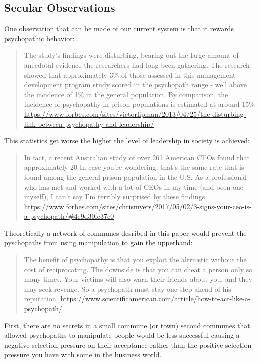 \documentclass[11pt]{article}
\begin{document}
\subsection{Secular Observations}

One observation that can be made of our current system is that it rewards psychopathic behavior:
\begin{quote}
   The study's findings were disturbing, bearing out the large amount of anecdotal evidence the researchers had long been gathering. The research showed that approximately 3\% of those assessed in this management development program study scored in the
   psychopath range - well above the incidence of 1\% in the general population. By comparison, the incidence of psychopathy in prison populations is estimated at around 15\% \url{https://www.forbes.com/sites/victorlipman/2013/04/25/the-disturbing-link-between-psychopathy-and-leadership/}
\end{quote}

This statistics get worse the higher the level of leadership in society is achieved:
\begin{quote}
In fact, a recent Australian study of over 261 American CEOs found that approximately 20%
In case you’re wondering, that’s the same rate that is found among the general prison population in the U.S.
As a professional who has met and worked with a lot of CEOs in my time (and been one myself), I can’t say I’m terribly surprised by these findings. \url{https://www.forbes.com/sites/chrismyers/2017/05/02/3-signs-your-ceo-is-a-psychopath/#4e9d30fe37e0}
\end{quote} 

Theoretically a network of communes desribed in this paper would prevent the pyschopaths from using manipulation to gain the upperhand:
\begin{quote}
The benefit of psychopathy is that you exploit the altruistic without the cost of reciprocating. The downside is that you can cheat a person only so many times. Your victims will also warn their friends about you, and they may seek revenge. So a psychopath must stay one step ahead of his reputation. \url{https://www.scientificamerican.com/article/how-to-act-like-a-psychopath/}
\end{quote} 
First, there are no secrets in a small commune (or town) second communes that allowed psychopaths to manipulate people would be less successful causing a negative selection pressure on their acceptance rather than the positive selection pressure you have with some in the business world. 
\end{document}
